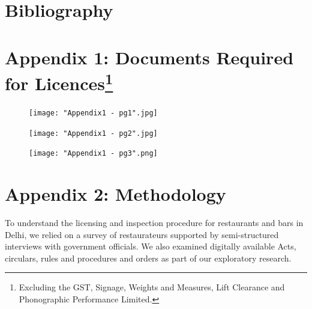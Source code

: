 \documentclass[a4paper, 12pt, twoside]{article}
\begin{document}
                 
                          
\section*{Bibliography}
\printbibliography[heading=none] 
	     
	
	
	      
        
		\newpage      
		\section*{Appendix 1: Documents Required for Licences\footnote{Excluding the GST, Signage, Weights and Measures, Lift Clearance and Phonographic Performance Limited.}}
		\label {Appendix1}
         
     

         
		\begin{figure}[H]
                    	\centering
                    	\texttt{[image: "Appendix1 - pg1".jpg]} 
		\end{figure}
		
		\begin{figure}[H]
                    	\centering
                    	\texttt{[image: "Appendix1 - pg2".jpg]} 
		\end{figure}
		
		\begin{figure}[H]
                    	\centering
                    	\texttt{[image: "Appendix1 - pg3".png]} 
		\end{figure}
        
        
        
		\newpage
		\section*{Appendix 2: Methodology}
		\label {Appendix2}
		To understand the licensing and inspection procedure for restaurants and bars in Delhi, we relied on a survey of restaurateurs supported by semi-structured interviews with government officials. We also examined digitally available Acts, circulars, rules 
and procedures and orders as part of our exploratory research.
		
\end{document}
